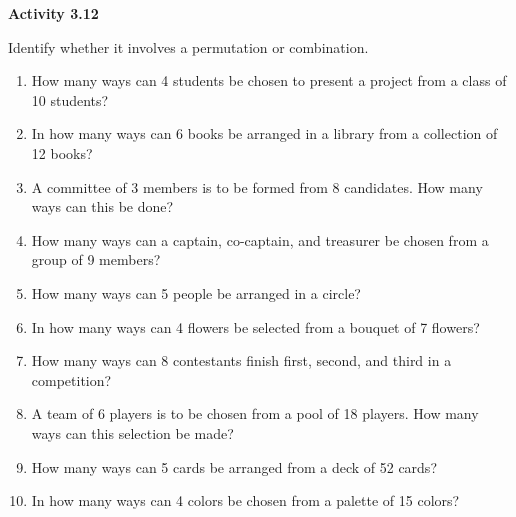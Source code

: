 \vspace{0.3ex}
\noindent\textbf{Activity 3.12}

\vspace{0.2ex}

Identify whether it involves a permutation or combination.

\begin{enumerate}[label=\color{blue}\arabic*.]
    \item How many ways can 4 students be chosen to present a project from a class of 10 students?
    \item In how many ways can 6 books be arranged in a library from a collection of 12 books?
    \item A committee of 3 members is to be formed from 8 candidates. How many ways can this be done?
    \item How many ways can a captain, co-captain, and treasurer be chosen from a group of 9 members?
    \item How many ways can 5 people be arranged in a circle?
    \item In how many ways can 4 flowers be selected from a bouquet of 7 flowers?
    \item How many ways can 8 contestants finish first, second, and third in a competition?
    \item A team of 6 players is to be chosen from a pool of 18 players. How many ways can this selection be made?
    \item How many ways can 5 cards be arranged from a deck of 52 cards?
    \item In how many ways can 4 colors be chosen from a palette of 15 colors?
\end{enumerate}
